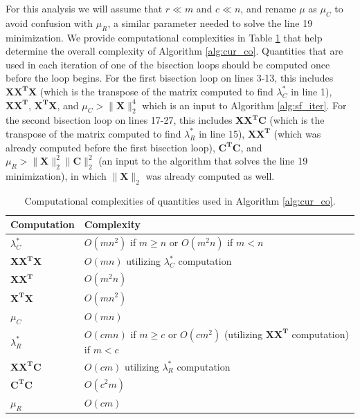 \documentclass[12pt]{article}
\begin{document}
For this analysis we will assume that $r \ll m$ and $c \ll n$, and rename $\mu$ as $\mu_C$ to avoid confusion with $\mu_R$, a similar parameter needed to solve the line 19 minimization. We provide computational complexities in Table \ref{tab:cc} that help determine the overall complexity of Algorithm \ref{alg:cur_co}.  Quantities that are used in each iteration of one of the bisection loops should be computed once before the loop begins. For the first bisection loop on lines 3-13, this includes $\mathbf{XX^TX}$ (which is the transpose of the matrix computed to find $\lambda_C^*$ in line 1), $\mathbf{XX^T}$, $\mathbf{X^TX}$, and $\mu_C > \| \mathbf{X} \|_2^4$ which is an input to Algorithm \ref{alg:sf_iter}. For the second bisection loop on lines 17-27, this includes $\mathbf{XX^TC}$ (which is the transpose of the matrix computed to find $\lambda_R^*$ in line 15), $\mathbf{XX^T}$ (which was already computed before the first bisection loop), $\mathbf{C^TC}$, and $\mu_R > \| \mathbf{X} \|_2^2 \| \mathbf{C} \|_2^2$ (an input to the algorithm that solves the line 19 minimization), in which $\| \mathbf{X} \|_2$ was already computed as well. 

\begin{table}[h]
    \centering
    \begin{tabular}{|l|l|}
        \hline
        \textbf{Computation} & \textbf{Complexity} \\
        \hline
         $\lambda_C^*$ & $O(mn^2)$ if $m \geq n$ or $O(m^2n)$ if $m < n$  \\  
         $\mathbf{XX^TX}$ & $O(mn)$ utilizing $\lambda_C^*$ computation \\
         $\mathbf{XX^T}$ & $O(m^2n)$ \\
         $\mathbf{X^TX}$ & $O(mn^2)$ \\
         $\mu_C$ & $O(mn)$ \\
         $\lambda_R^*$ &  $O(cmn)$ if $m \geq c$ or $O(cm^2)$ (utilizing $\mathbf{XX^T}$ computation) if $m < c$  \\
         $\mathbf{XX^TC}$ & $O(cm)$ utilizing $\lambda_R^*$ computation\\
         $\mathbf{C^TC}$ & $O(c^2m)$ \\
         $\mu_R$ & $O(cm)$ \\         
        \hline
    \end{tabular}
    \caption{Computational complexities of quantities used in Algorithm \ref{alg:cur_co}.}
    \label{tab:cc}
\end{table}
\end{document}
